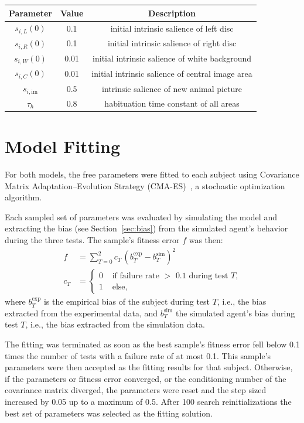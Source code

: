 \documentclass[a4paper]{scrreprt}
\begin{document}
\begin{center}
\begin{tabular}{ c  c  c }
\hline
Parameter & Value & Description\\
\hline
$s_{i, L}(0)$ & 0.1 & initial intrinsic salience of left disc\\
$s_{i, R}(0)$ & 0.1 & initial intrinsic salience of right disc\\
$s_{i, W}(0)$ & 0.01 & initial intrinsic salience of white background\\
$s_{i, C}(0)$ & 0.01 & initial intrinsic salience of central image area\\
$s_{i, \text{im}}$ & 0.5 & intrinsic salience of new animal picture\\
$\tau_{h}$ & 0.8 & habituation time constant of all areas\\
\hline
\end{tabular}
\label{tab:params_int_sal2}
\end{center}


\section{Model Fitting}
\label{sec:model_fitting}

For both models, the free parameters were fitted to each subject using Covariance Matrix Adaptation--Evolution Strategy (CMA-ES)~\cite{hansen06}, a stochastic optimization algorithm.

Each sampled set of parameters was evaluated by simulating the model and extracting the bias (see Section~\ref{sec:bias}) from the simulated agent's behavior during the three tests. The sample's fitness error $f$ was then:
\begin{align}
f &= \sum^2_{T=0} c_T \, (b^{\text{exp}}_{T} - b^{\text{sim}}_{T})^2 \\
c_T &= 
\begin{cases}
0 & \text{ if failure rate $>$ 0.1 during test $T$,}\\
1 & \text{ else,}
\end{cases}
\end{align}
where $b^{\text{exp}}_T$ is the empirical bias of the subject during test $T$, i.e., the bias extracted from the experimental data, and $b^{\text{sim}}_T$ the simulated agent's bias during test $T$, i.e., the bias extracted from the simulation data.

The fitting was terminated as soon as the best sample's fitness error fell below 0.1 times the number of tests with a failure rate of at most 0.1. This sample's parameters were then accepted as the fitting results for that subject. Otherwise, if the parameters or fitness error converged, or the conditioning number of the covariance matrix diverged, the parameters were reset and the step sized increased by 0.05 up to a maximum of 0.5. After 100 search reinitializations the best set of parameters was selected as the fitting solution.
\end{document}
